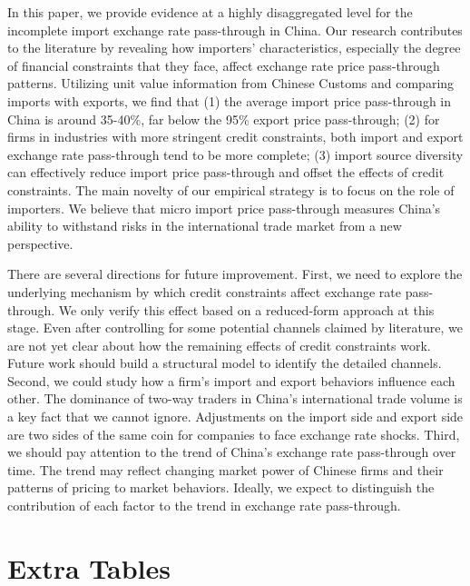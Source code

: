 \documentclass[12pt]{article}
\begin{document}
In this paper, we provide evidence at a highly disaggregated level for the incomplete import exchange rate pass-through in China. Our research contributes to the literature by revealing how importers' characteristics, especially the degree of financial constraints that they face, affect exchange rate price pass-through patterns. Utilizing unit value information from Chinese Customs and comparing imports with exports, we find that (1) the average import price pass-through in China is around 35-40\%, far below the 95\% export price pass-through; (2) for firms in industries with more stringent credit constraints, both import and export exchange rate pass-through tend to be more complete; (3) import source diversity can effectively reduce import price pass-through and offset the effects of credit constraints. The main novelty of our empirical strategy is to focus on the role of importers. We believe that micro import price pass-through measures China's ability to withstand risks in the international trade market from a new perspective.

There are several directions for future improvement. First, we need to explore the underlying mechanism by which credit constraints affect exchange rate pass-through. We only verify this effect based on a reduced-form approach at this stage. Even after controlling for some potential channels claimed by literature, we are not yet clear about how the remaining effects of credit constraints work. Future work should build a structural model to identify the detailed channels. Second, we could study how a firm's import and export behaviors influence each other. The dominance of two-way traders in China's international trade volume is a key fact that we cannot ignore. Adjustments on the import side and export side are two sides of the same coin for companies to face exchange rate shocks. Third, we should pay attention to the trend of China's exchange rate pass-through over time. The trend may reflect changing market power of Chinese firms and their patterns of pricing to market behaviors. Ideally, we expect to distinguish the contribution of each factor to the trend in exchange rate pass-through. 

\newpage 


\appendix

\section{Extra Tables}\label{Appendix-Tables}
\end{document}
